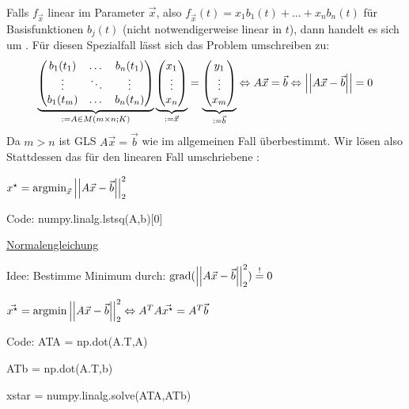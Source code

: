 Falls $f_{\vec{x}}$ linear im Parameter $\vec{x}$, also $f_{\vec{x}} (t) = x_1 b_1 (t) +
\dots + x_n b_n (t)$ für Basisfunktionen $b_j(t)$ (nicht notwendigerweise linear in $t$),
dann handelt es sich um . Für diesen Spezialfall lässt sich
das Problem umschreiben zu:
\begin{align*}
    \underbrace{\begin{pmatrix}
        b_1(t_1) & \dots & b_n(t_1) \\
        \vdots& \ddots & \vdots \\
        b_1(t_m) & \dots & b_n(t_n)
    \end{pmatrix}}_{:= A \in M(m \times n;K)}
    \underbrace{\begin{pmatrix}
        x_1 \\ \vdots \\ x_n
    \end{pmatrix}}_{:= \vec{x}}
    = \underbrace{\begin{pmatrix}
        y_1 \\ \vdots \\ x_m
    \end{pmatrix}}_{:= \vec{b}}
    \Leftrightarrow
    A \vec{x} = \vec{b}
    \Leftrightarrow
    \left\vert\left\vert A \vec{x} - \vec{b} \right\vert\right\vert = 0
\end{align*}
Da $m>n$ ist GLS $A \vec{x} = \vec{b}$ wie im allgemeinen Fall überbestimmt. Wir lösen also
Stattdessen das für den linearen Fall umschriebene :

$x^\star = \text{argmin}_{\vec{x}} \left\vert\left\vert A \vec{x} - \vec{b} \right\vert\right\vert_2^2$

Code: numpy.linalg.lstsq(A,b)[0]

\vspace{1\baselineskip}

\underline{Normalengleichung}

Idee: Bestimme Minimum durch: $\text{grad} (\left\vert\left\vert A \vec{x} - \vec{b} \right\vert\right\vert_2^2) \stackrel{!}{=} 0$

$\vec{x^\star} = \text{argmin} \left\vert\left\vert A \vec{x} - \vec{b} \right\vert\right\vert_2^2 \Leftrightarrow A^T A \vec{x^\star} = A^T \vec{b}$

Code: ATA = np.dot(A.T,A)

\hspace{27pt} ATb = np.dot(A.T,b)

\hspace{27pt} xstar = numpy.linalg.solve(ATA,ATb)

\vspace{1\baselineskip}

